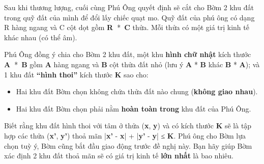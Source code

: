 Sau khi thương lượng, cuối cùng Phú Ông quyết định sẽ cắt cho Bờm 2 khu đất trong quỹ đất của mình để đổi lấy chiếc quạt mo. Quỹ đất của phú ông có dạng R hàng ngang và C cột dọt gồm \textbf{R }* \textbf{C} thửa. Mỗi thửa có một giá trị kinh tế khác nhau (có thể âm).

Phú Ông đồng ý chia cho Bờm 2 khu đất, một khu \textbf{hình chữ nhật} kích thước \textbf{A }* \textbf{B} gồm \textbf{A} hàng ngang và \textbf{B }cột thửa đất nhỏ (lưu ý \textbf{A} * \textbf{B} khác \textbf{B} * \textbf{A}); và 1 khu đất \textbf{“hình thoi”} kích thước \textbf{K} sao cho:
\begin{itemize}
	\item Hai khu đất Bờm chọn không chứa thửa đất nào chung (\textbf{không giao nhau}).
	\item Hai khu đất Bờm chọn phải nằm \textbf{hoàn toàn trong} khu đất của Phú Ông.
\end{itemize}

Biết rằng khu đất hình thoi với tâm ở thửa (\textbf{x}, \textbf{y}) và có kích thước \textbf{K} sẽ là tập hợp các thửa (\textbf{x'}, \textbf{y'}) thoả mãn |\textbf{x’} - \textbf{x}| + |\textbf{y’} - \textbf{y}| ≤ \textbf{K}. Phú ông cho Bờm lựa chọn tuỳ ý, Bờm cũng bắt đầu giao động trước đề nghị này. Bạn hãy giúp Bờm xác định 2 khu đất thoả mãn sẽ có giá trị kinh tế \textbf{lớn nhất} là bao nhiêu.